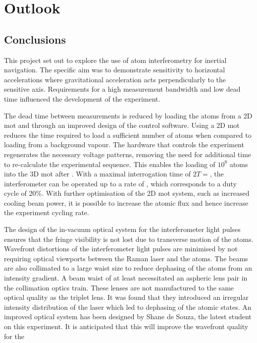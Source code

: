\chapter{Outlook}
\section{Conclusions}
This project set out to explore the use of atom interferometry for
inertial navigation. The specific aim was to demonstrate sensitivity
to horizontal accelerations where gravitational acceleration acts
perpendicularly to the sensitive axis. Requirements for a high
measurement bandwidth and low dead time influenced the development of
the experiment. \par\noindent
The dead time between measurements is reduced by
loading the atoms from a 2D \ac{mot} and through an improved design of
the control software. Using a 2D \ac{mot} reduces the time required to
load a sufficient number of atoms when compared to loading from a
background vapour. The hardware that controls the experiment
regenerates the necessary voltage patterns, removing the need for
additional time to
re-calculate the experimental sequence. This enables the loading of
$10^8$ atoms into the 3D \ac{mot} after . With a
maximal interrogation time of $2T = $, the
interferometer can be operated up to a rate of , which
corresponds to a duty cycle of 20\%. With further optimisation of the
2D \ac{mot} system, such as increased cooling beam power, it is
possible to increase the atomic flux and hence increase the experiment
cycling rate. 
\par\noindent
The design of the in-vacuum optical system for the interferometer
light pulses ensures that the fringe visibility is not lost due to
transverse motion of the atoms. Wavefront distortions
of the interferometer light pulses are minimised by not requiring
optical viewports between the Raman laser and the atoms. The beams
are also collimated to a large waist size to reduce dephasing of the
atoms from an intensity gradient. A beam waist of at least
 necessitated an aspheric lens pair in the
collimation optics train. These lenses are not manufactured to the same
optical quality as the triplet lens. It was found that they introduced
an irregular intensity distribution of the laser which led to
dephasing of the atomic states. An improved optical system has been
designed by Shane de Souza, the latest student on this experiment. It
is anticipated that this will improve the wavefront quality for the
